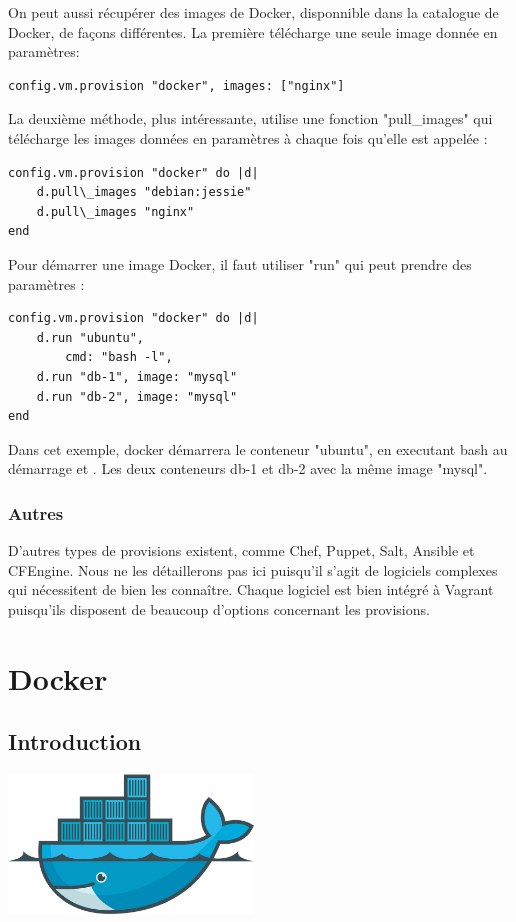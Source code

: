 \documentclass[12pt,a4paper]{article}
\begin{document}
On peut aussi récupérer des images de Docker, disponnible dans la catalogue de Docker, de façons différentes. La première télécharge une seule image donnée en paramètres:
\begin{lstlisting}
config.vm.provision "docker", images: ["nginx"]
\end{lstlisting}
La deuxième méthode, plus intéressante, utilise une fonction "pull\_images" qui télécharge les images données en paramètres à chaque fois qu'elle est appelée : 
\begin{lstlisting}
config.vm.provision "docker" do |d|
	d.pull\_images "debian:jessie"
	d.pull\_images "nginx"
end
\end{lstlisting}

Pour démarrer une image Docker, il faut utiliser "run" qui peut prendre des paramètres :
\begin{lstlisting}
config.vm.provision "docker" do |d|
	d.run "ubuntu",
		cmd: "bash -l",
	d.run "db-1", image: "mysql"
	d.run "db-2", image: "mysql"
end
\end{lstlisting}
Dans cet exemple, docker démarrera le conteneur "ubuntu", en executant bash au démarrage et . Les deux conteneurs db-1 et db-2 avec la même image "mysql".

\subsubsection{Autres}

D'autres types de provisions existent, comme Chef, Puppet, Salt, Ansible et CFEngine. Nous ne les détaillerons pas ici puisqu'il s'agit de logiciels complexes qui nécessitent de bien les connaître. Chaque logiciel est bien intégré à Vagrant puisqu'ils disposent de beaucoup d'options concernant les provisions.

\section{Docker}

\subsection{Introduction}
\begin{center}
  \includegraphics[width=6.5cm]{images_rapport/docker_logo.jpg}
\end{center}
\end{document}

